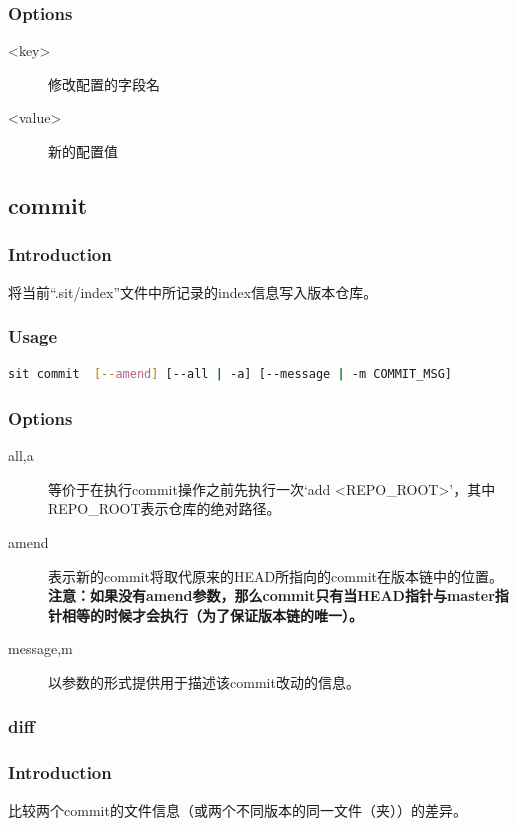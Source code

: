 \documentclass[11pt, a4paper, UTF8]{ctexart}
\begin{document}
\subsubsection{Options}
\begin{description}
	\item[\YaHeiMono <key>] 修改配置的字段名
	\item[\YaHeiMono <value>] 新的配置值
\end{description}

\subsection{commit}
\subsubsection{Introduction}
将当前``.sit/index''文件中所记录的index信息写入版本仓库。
\subsubsection{Usage}
\begin{lstlisting}[language=sh,basicstyle=\small\YaHeiMono,numbers=none]
sit commit  [--amend] [--all | -a] [--message | -m COMMIT_MSG]
\end{lstlisting}
\subsubsection{Options}
\begin{description}
	\item[\YaHeiMono all,a] 等价于在执行commit操作之前先执行一次`add <REPO\_ROOT>'，其中REPO\_ROOT表示仓库的绝对路径。
	\item[\YaHeiMono amend] 表示新的commit将取代原来的HEAD所指向的commit在版本链中的位置。\\\textbf{注意：如果没有amend参数，那么commit只有当HEAD指针与master指针相等的时候才会执行（为了保证版本链的唯一）。}
	\item[\YaHeiMono message,m] 以参数的形式提供用于描述该commit改动的信息。
\end{description}

\subsubsection{diff}
\subsubsection{Introduction}
比较两个commit的文件信息（或两个不同版本的同一文件（夹））的差异。
\end{document}
